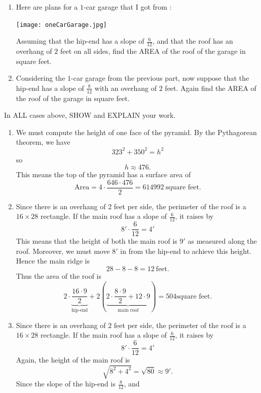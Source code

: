 \documentclass[hints,nooutcomes,noauthor]{ximera}
\begin{document}
\begin{question}
\begin{enumerate}
\item Here are plans for a $1$-car garage that I got from :
   \begin{center}
     \texttt{[image: oneCarGarage.jpg]}
   \end{center}
   Assuming that the hip-end has a slope of $\frac{6}{12}$, and that
   the roof has an overhang of $2$ feet on all sides, find the AREA of
   the roof of the garage in square feet.
 \item Considering the $1$-car garage from the previous part, now
   suppose that the hip-end has a slope of $\frac{8}{12}$ with an
   overhang of $2$ feet. Again find the AREA of the roof of the
   garage in square feet.
\end{enumerate}
In ALL cases above, SHOW and EXPLAIN your work.
\begin{freeResponse}
  \begin{enumerate}
    \item We must compute the height of one face of the pyramid. By
      the Pythagorean theorem, we have
      \[
      323^2 + 350^2 = h^2
      \]
      so
      \[
      h \approx 476.
      \]
      This means the top of the pyramid has a surface area of
      \[
      \text{Area} = 4\cdot \frac{646\cdot 476}{2} = 614992~\text{square feet}.
      \]
    \item Since there is an overhang of $2$ feet per side, the
      perimeter of the roof is a $16\times 28$ rectangle. If the main
      roof has a slope of $\frac{6}{12}$, it raises by
      \[
      8'\cdot \frac{6}{12}  = 4'
      \]
      This means that the height of both the main roof is $9'$ as
      measured along the roof. Moreover, we must move $8'$ in from the
      hip-end to achieve this height. Hence the main ridge is
      \[
      28-8-8 = 12~\text{feet}.
      \]
      Thus the area of the roof is
      \[
      2\cdot \underbrace{\frac{16\cdot 9}{2}}_{\text{hip-end}} +
      2\left(\underbrace{2\cdot \frac{8\cdot 9}{2} + 12\cdot
        9}_{\text{main roof}}\right) = 504 \text{square feet}.
      \]
    \item Since there is an overhang of $2$ feet per side, the
      perimeter of the roof is a $16\times 28$ rectangle. If the main
      roof has a slope of $\frac{6}{12}$, it raises by
      \[
      8'\cdot \frac{6}{12}  = 4'
      \]
      Again, the height of the main roof is
      \[
      \sqrt{8^2+4^2} = \sqrt{80}\approx 9'.
      \]
      Since the slope of the hip-end is $\frac{8}{12}$, and

\end{enumerate}
\end{freeResponse}
\end{question}
\end{document}
